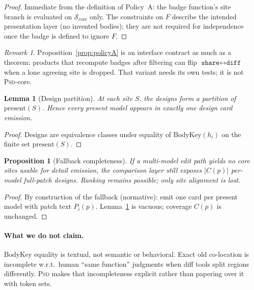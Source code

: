 \documentclass[
  11pt,
  a4paper,
  oneside,
  numbers=noenddot,
  abstract=true,
  headings=normal,
  DIV=11,
  BCOR=0mm,
]{scrartcl}
\theoremstyle{definition}
\theoremstyle{plain}
\newtheorem{proposition}[definition]{Proposition}
\newtheorem{lemma}[definition]{Lemma}
\theoremstyle{remark}
\newtheorem{remark}[definition]{Remark}
\newcommand{\PSD}{\textsc{Psd}}
\newcommand{\badge}[1]{\texttt{#1}}
\newcommand{\BodyKey}{\mathrm{BodyKey}}
\begin{document}
\begin{proof}
Immediate from the definition of Policy~A: the badge function's site
branch is evaluated on $\mathcal{S}_{\mathrm{core}}$ only. The constraints
on $F$ describe the intended presentation layer (no invented bodies); they
are not required for independence once the badge is defined to ignore $F$.
\end{proof}

\begin{remark}
Proposition~\ref{prop:policyA} is an interface contract as much as a
theorem: products that recompute badges after filtering can flip
$\badge{share}\leftrightarrow\badge{diff}$ when a lone agreeing site is
dropped. That variant needs its own tests; it is not \PSD{}-core.
\end{remark}

\begin{lemma}[Design partition]
\label{lem:partition}
At each site $S$, the designs form a partition of $\mathrm{present}(S)$.
Hence every present model appears in exactly one design card emission.
\end{lemma}

\begin{proof}
Designs are equivalence classes under equality of $\BodyKey(h_i)$ on the
finite set $\mathrm{present}(S)$.
\end{proof}

\begin{proposition}[Fallback completeness]
\label{prop:fallback}
If a multi-model edit path yields no core sites usable for detail
emission, the comparison layer still exposes $|C(p)|$ per-model full-patch
designs. Ranking remains possible; only site alignment is lost.
\end{proposition}

\begin{proof}
By construction of the fallback (normative): emit one card per present
model with patch text $P_i(p)$. Lemma~\ref{lem:partition} is vacuous;
coverage $C(p)$ is unchanged.
\end{proof}

\paragraph{What we do not claim.}
$\BodyKey$ equality is textual, not semantic or behavioral. Exact
$\mathrm{old}$ co-location is incomplete w.r.t.\ human ``same function''
judgments when diff tools split regions differently. \PSD{} makes that
incompleteness explicit rather than papering over it with token sets.
\end{document}
